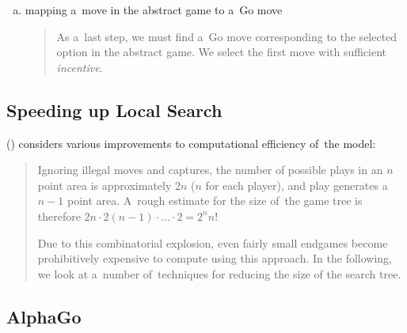 \begin{enumerate}[(a)]
  \item mapping a~move in the abstract game to a~Go move
    \begin{quotation}
      As a~last step, we must find a~Go move corresponding to the selected option in the abstract game.
      We select the first move with sufficient \emph{incentive}.
    \end{quotation}
\end{enumerate}

\subsection{Speeding up Local Search}

(\cite{Muller1995computer}) considers various improvements to computational efficiency of~the model:
\begin{quotation}
  Ignoring illegal moves and captures, the number of possible plays in an $n$ point area is approximately $2n$ ($n$ for each player), and play generates a $n-1$ point area.
  A~rough estimate for the size of~the game tree is therefore $2n\cdot2(n-1)\cdot \ldots \cdot2 = 2^n n!$

  Due to this combinatorial explosion, even fairly small endgames become prohibitively expensive to compute using this approach.
  In the following, we look at a~number of~techniques for reducing the size of the search tree.
\end{quotation}

\clearpage

\subsection{AlphaGo}
\label{ssec:AlphaGo}
\todo
